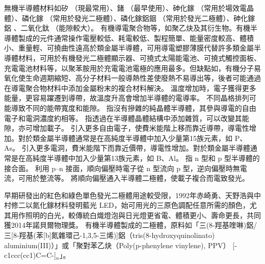 \documentclass[a4paper,12pt]{report}
\begin{document}
無機半導體材料如矽 （現最常用）、鍺 （最早使用）、砷化鎵 （常用於場效電晶體）、磷化鎵 （常用於發光二極體）、磷化鎵鋁銦 （常用於發光二極體）、砷化鎵鋁 、二氧化鈦 （能隙較大）。
有機導電聚合物等，如聚乙炔及其衍生物。有機半導體製成的元件通常操作電壓較低、耗電較低、製程簡單、能量密度較高、體積小、重量輕、可撓曲性遠高於類金屬半導體，可用導電塑膠薄膜代替許多類金屬半導體材料，可用於有機發光二極體顯示器、可撓式太陽能電池、可撓式觸控面板、充電電池材料等，以聚苯胺用於充電電池電極的應用最多。但缺點如，有機分子易氧化使生命週期縮短、高分子材料一般導熱性差使廢熱不易導出等，後者可能通過在導電聚合物材料中添加金屬粉末的複合材料解決。
溫度增加時，電子獲得更多能量，更容易躍遷到導帶，故溫度升高會增加半導體的電導率。
不同晶格排列可能導致不同的能帶寬度和能隙。
指沒有摻雜的純晶體半導體，其參與導電的自由電子和電洞濃度約相等。
指透過在半導體晶體結構中添加雜質，可以改變其能隙，亦可增加載子。
引入更多自由電子，使費米能階上移而靠近導帶，導電性增加。對於類金屬半導體通常是在高純度半導體中加入少量第15族元素，如 P、As。
引入更多電洞，費米能階下而靠近價帶，導電性增加。對於類金屬半導體通常是在高純度半導體中加入少量第13族元素，如 B、Al。
指 n 型和 p 型半導體的接合面。
利用 p–n 接面，順向偏壓時電子從 n 型流向 p 型，逆向偏壓時無電流，可用於整流等。
將順向偏壓通入半導體二極體，使載子複合而電致發光。

早期研發出的紅色和綠色單色發光二極體用途較受限，1992年赤崎勇、天野浩與中村修二以氮化鎵材料發明藍光 LED，始可用光的三原色調配任意所需的顏色，尤其用作照明的白光，較傳統白熾燈泡與日光燈更省電、體積更小、壽命更長，共同獲2014年諾貝爾物理獎。
有機半導體製成的二極體，原料如「三(8-羥基喹啉)鋁/三[8-羥基(苯[b]氮雜環己-1,3,5-三烯)]鋁（tris(8-hydroxyquinolinato) aluminium(III)）」或「聚對苯乙炔（Poly(p-phenylene vinylene), PPV） [-c1ccc(cc1)C=C-]$_n$」。
\end{document}
